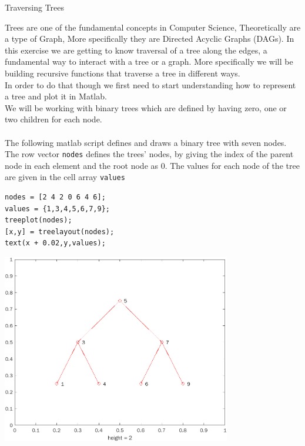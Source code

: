\begin{task}{Traversing Trees}{}{}

  Trees are one of the fundamental concepts in Computer Science, Theoretically are a type of Graph,
  More specifically they are Directed Acyclic Graphs (DAGs).
  In this exercise we are getting to know traversal of a tree along the edges, a fundamental way to interact with a tree or a graph.
  More specifically we will be building recursive functions that traverse a tree in different ways.\\
  In order to do that though we first need to start understanding how to represent a tree and plot it in Matlab.\\

  We will be working with binary trees which are defined by having zero, one or two children for each node.\\ \\
  The following matlab script defines and draws a binary tree with seven
  nodes. The row vector \lstinline!nodes! defines the trees'
  nodes, by giving the index of the parent node in each element and the
  root node as 0. The values for each node of the tree are given in the
  cell array \lstinline!values!

  \begin{lstlisting}
nodes = [2 4 2 0 6 4 6];
values = {1,3,4,5,6,7,9};
treeplot(nodes);
[x,y] = treelayout(nodes);
text(x + 0.02,y,values);
\end{lstlisting}

  \begin{center}

    \includegraphics[width=10cm]{gfx/2021_14_tree_traversal.png}
  \end{center}


\end{task}
